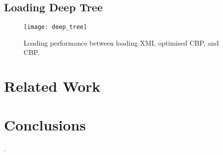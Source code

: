 \subsection{Loading Deep Tree}
\begin{figure}[b!]
\centering
\texttt{[image: deep\_tree]}
\caption{Loading performance between loading XMI, optimised CBP, and CBP.}
\label{fig:deep_tree}
\end{figure}

\section{Related Work}

\section{Conclusions}


\cite{Lamport:LaTeX}.


\begin{acks}

\end{acks}
